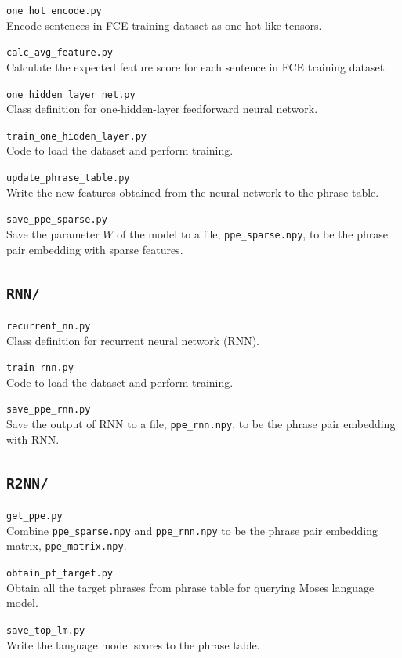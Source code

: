 \documentclass[12pt,a4paper,twoside,openright]{report}
\begin{document}
\texttt{one\_hot\_encode.py}\\
Encode sentences in FCE training dataset as one-hot like tensors.

\texttt{calc\_avg\_feature.py}\\
Calculate the expected feature score for each sentence in FCE training dataset.

\texttt{one\_hidden\_layer\_net.py}\\
Class definition for one-hidden-layer feedforward neural network.

\texttt{train\_one\_hidden\_layer.py}\\
Code to load the dataset and perform training.

\texttt{update\_phrase\_table.py}\\
Write the new features obtained from the neural network to the phrase table.

\texttt{save\_ppe\_sparse.py}\\
Save the parameter $W$ of the model to a file, \texttt{ppe\_sparse.npy}, to be the phrase pair embedding with sparse features.

\subsection{\texttt{RNN/}}
\texttt{recurrent\_nn.py}\\
Class definition for recurrent neural network (RNN).

\texttt{train\_rnn.py}\\
Code to load the dataset and perform training.

\texttt{save\_ppe\_rnn.py}\\
Save the output of RNN to a file, \texttt{ppe\_rnn.npy}, to be the phrase pair embedding with RNN.

\subsection{\texttt{R2NN/}}
\texttt{get\_ppe.py}\\
Combine \texttt{ppe\_sparse.npy} and \texttt{ppe\_rnn.npy} to be the phrase pair embedding matrix, \texttt{ppe\_matrix.npy}.

\texttt{obtain\_pt\_target.py}\\
Obtain all the target phrases from phrase table for querying Moses language model.

\texttt{save\_top\_lm.py}\\
Write the language model scores to the phrase table.
\end{document}
